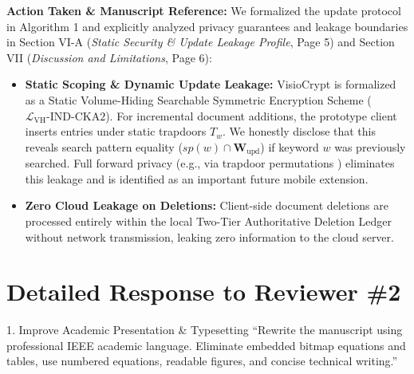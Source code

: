 \documentclass[11pt,a4paper]{article}
\begin{document}
\begin{responsebox}
\textbf{Action Taken \& Manuscript Reference:} We formalized the update protocol in Algorithm 1 and explicitly analyzed privacy guarantees and leakage boundaries in Section VI-A (\emph{Static Security \& Update Leakage Profile}, Page 5) and Section VII (\emph{Discussion and Limitations}, Page 6):

\begin{itemize}[itemsep=2pt]
    \item \textbf{Static Scoping \& Dynamic Update Leakage:} VisioCrypt is formalized as a Static Volume-Hiding Searchable Symmetric Encryption Scheme ($\mathcal{L}_{\text{VH}}\text{-IND-CKA2}$). For incremental document additions, the prototype client inserts entries under static trapdoors $T_w$. We honestly disclose that this reveals search pattern equality ($sp(w) \cap \mathbf{W}_{\text{upd}}$) if keyword $w$ was previously searched. Full forward privacy (e.g., via trapdoor permutations \cite{bost2016sophos}) eliminates this leakage and is identified as an important future mobile extension.
    \item \textbf{Zero Cloud Leakage on Deletions:} Client-side document deletions are processed entirely within the local Two-Tier Authoritative Deletion Ledger without network transmission, leaking zero information to the cloud server.
\end{itemize}
\end{responsebox}

\vspace{1.5em}

\section{Detailed Response to Reviewer \#2}

\begin{reviewbox}{1. Improve Academic Presentation \& Typesetting}
``Rewrite the manuscript using professional IEEE academic language. Eliminate embedded bitmap equations and tables, use numbered equations, readable figures, and concise technical writing.''
\end{reviewbox}
\end{document}
